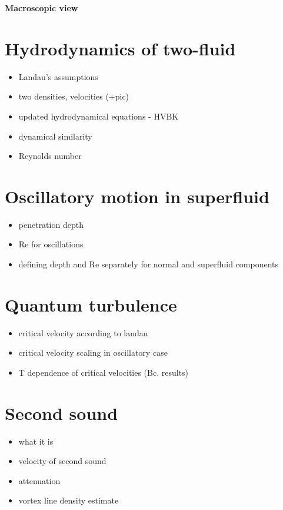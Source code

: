 \newpage

{\Huge \bfseries Macroscopic view}
\vspace{0.3cm}

\section{Hydrodynamics of two-fluid}
\begin{itemize}
	\item Landau's assumptions
	\item two densities, velocities (+pic)
	\item updated hydrodynamical equations - HVBK
	\item dynamical similarity
	\item Reynolds number
\end{itemize}

\section{Oscillatory motion in superfluid}
\begin{itemize}
	\item penetration depth
	\item Re for oscillations
	\item defining depth and Re separately for normal and superfluid components
\end{itemize}

\section{Quantum turbulence}
\begin{itemize}
	\item critical velocity according to landau
	\item critical velocity scaling in oscillatory case
	\item T dependence of critical velocities (Bc. results)
\end{itemize}

\section{Second sound}
\begin{itemize}
	\item what it is
	\item velocity of second sound
	\item attenuation
	\item vortex line density estimate
\end{itemize}

\newpage
